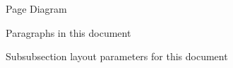 \documentclass[
    fontsize=11,
    paper=letter,
    chapterprefix=true,  %
    appendixprefix=true,  %
    numbers=noendperiod,  %
    toc=flat,  %
    usegeometry=true  %
  ]{scrreprt}
\begin{document}
\begin{center}
\pagevalues
\end{center}


\begin{figure}
\currentpage
\pagediagram
\caption{Page Diagram}
\end{figure}

\newpage
\begin{center}
\paragraphvalues
\end{center}

\currentparagraph
\begin{figure}
\paragraphdiagram
\caption{Paragraphs in this document}
\end{figure}

\newpage
\currentheading
\trybeforeskip{-\baselineskip}
\tryindent{0mm}
\begin{figure}
\headingdesign{\large\itshape}
\caption{Subsubsection layout parameters for this document}
\label{fig:hdudf}
\end{figure}
\end{document}
